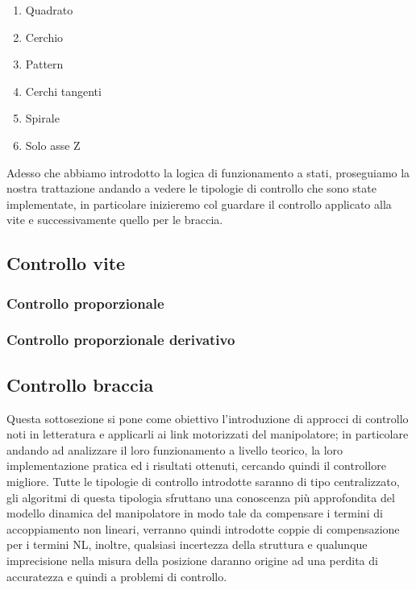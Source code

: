 \begin{enumerate}
	\item Quadrato
	\item Cerchio
	\item Pattern
	\item Cerchi tangenti
	\item Spirale
	\item Solo asse Z
\end{enumerate}
Adesso che abbiamo introdotto la logica di funzionamento a stati, proseguiamo la nostra trattazione andando a vedere le tipologie di controllo che sono state implementate, in particolare inizieremo col guardare il controllo applicato alla vite e successivamente quello per le braccia.
\subsection{Controllo vite}

\subsubsection{Controllo proporzionale}
\subsubsection{Controllo proporzionale derivativo}
\subsection{Controllo braccia}
Questa sottosezione si pone come obiettivo l'introduzione di approcci di controllo noti in letteratura e applicarli ai link motorizzati del manipolatore; in particolare andando ad analizzare il loro funzionamento a livello teorico, la loro implementazione pratica ed i risultati ottenuti, cercando quindi il controllore migliore. Tutte le tipologie di controllo introdotte saranno di tipo centralizzato, gli algoritmi di questa tipologia sfruttano una conoscenza più approfondita del modello dinamica del manipolatore in modo tale da compensare i termini di accoppiamento non lineari, verranno quindi introdotte coppie di compensazione per i termini NL, inoltre, qualsiasi incertezza della struttura e qualunque imprecisione nella misura della posizione daranno origine ad una perdita di accuratezza e quindi a problemi di controllo.

